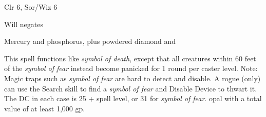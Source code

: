 
\begin{description*}
\item[Level:] Clr 6, Sor/Wiz 6
\item[Saving Throw:] Will negates
\item[Arcane Material Component:] Mercury and phosphorus, plus powdered diamond and
\end{description*}

This spell functions like \textit{symbol of death}, except that all creatures within
60 feet of the \textit{symbol of fear} instead become panicked for 1 round per
caster level.
Note: Magic traps such as \textit{symbol of fear} are hard to detect and
disable. A rogue (only) can use the Search skill to find a \textit{symbol of fear
}and Disable Device to thwart it. The DC in each case is 25 + spell level, or 31
for \textit{symbol of fear}.
opal with a total value of at least 1,000 gp.
